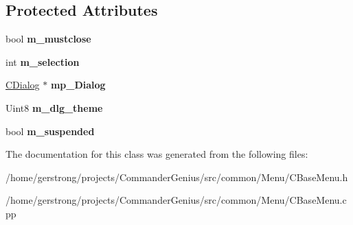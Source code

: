 \subsection*{Protected Attributes}
\begin{DoxyCompactItemize}
\item 
\hypertarget{class_c_base_menu_adb7f9e27a2896420101f17c5545e0a78}{
bool {\bfseries m\_\-mustclose}}
\label{class_c_base_menu_adb7f9e27a2896420101f17c5545e0a78}

\item 
\hypertarget{class_c_base_menu_a51fca71eb6a7ee322ae6354de830f089}{
int {\bfseries m\_\-selection}}
\label{class_c_base_menu_a51fca71eb6a7ee322ae6354de830f089}

\item 
\hypertarget{class_c_base_menu_a0a222f54bd467c73473c06f98fc043b9}{
\hyperlink{class_c_dialog}{CDialog} $\ast$ {\bfseries mp\_\-Dialog}}
\label{class_c_base_menu_a0a222f54bd467c73473c06f98fc043b9}

\item 
\hypertarget{class_c_base_menu_a53ef56236b29385332f48a1e50b15a59}{
Uint8 {\bfseries m\_\-dlg\_\-theme}}
\label{class_c_base_menu_a53ef56236b29385332f48a1e50b15a59}

\item 
\hypertarget{class_c_base_menu_a4c34cf529584e5c4f6bf237ace245530}{
bool {\bfseries m\_\-suspended}}
\label{class_c_base_menu_a4c34cf529584e5c4f6bf237ace245530}

\end{DoxyCompactItemize}


The documentation for this class was generated from the following files:\begin{DoxyCompactItemize}
\item 
/home/gerstrong/projects/CommanderGenius/src/common/Menu/CBaseMenu.h\item 
/home/gerstrong/projects/CommanderGenius/src/common/Menu/CBaseMenu.cpp\end{DoxyCompactItemize}
